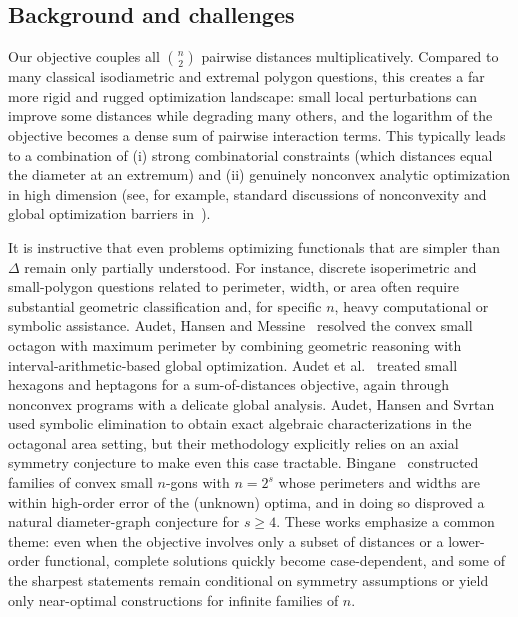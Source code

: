 \documentclass{article}
\theoremstyle{definition}
\let\ge\geqslant
\begin{document}
\subsection{Background and challenges}

Our objective couples all $\binom{n}{2}$ pairwise distances multiplicatively.
Compared to many classical isodiametric and extremal polygon questions, this creates a far more rigid and rugged optimization landscape:
small local perturbations can improve some distances while degrading many others, and the logarithm of the objective
becomes a dense sum of pairwise interaction terms. This typically leads to a combination of
(i) strong combinatorial constraints (which distances equal the diameter at an extremum) and
(ii) genuinely nonconvex analytic optimization in high dimension (see, for example, standard discussions of nonconvexity and
global optimization barriers in~\cite{nocedal2006numerical}).

It is instructive that even problems optimizing functionals that are simpler than $\Delta$ remain only partially understood.
For instance, discrete isoperimetric and small-polygon questions related to perimeter, width, or area
often require substantial geometric classification and, for specific $n$, heavy computational or symbolic assistance.
Audet, Hansen and Messine~\cite{AUDET2007135} resolved the convex small octagon with maximum perimeter by combining geometric reasoning
with interval-arithmetic-based global optimization.
Audet et al.~\cite{Audet2011SmallHexagonHeptagonSumDistances} treated small hexagons and heptagons for a sum-of-distances objective,
again through nonconvex programs with a delicate global analysis.
Audet, Hansen and Svrtan~\cite{AudetHansenSvrtan2021Symbolic} used symbolic elimination to obtain exact algebraic characterizations in the octagonal area setting, but their methodology
explicitly relies on an axial symmetry conjecture to make even this case tractable. Bingane~\cite{Bingane2021MaxPerimWidthSmallPolygon} constructed families of convex small $n$-gons with $n=2^s$ whose perimeters and widths are within high-order error of the (unknown) optima,
and in doing so disproved a natural diameter-graph conjecture for $s\ge 4$.
These works emphasize a common theme: even when the objective involves only a subset of distances or a lower-order functional,
complete solutions quickly become case-dependent, and some of the sharpest statements remain conditional on symmetry assumptions
or yield only near-optimal constructions for infinite families of $n$.
\end{document}

